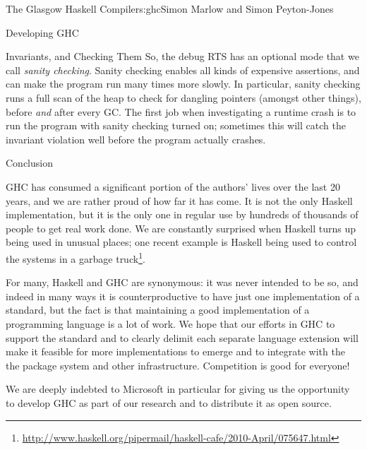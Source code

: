 \begin{aosachapter}{The Glasgow Haskell Compiler}{s:ghc}{Simon Marlow and Simon Peyton-Jones}
\begin{aosasect1}{Developing GHC}
\begin{aosasect2}{Invariants, and Checking Them}
So, the debug RTS has an optional mode that we call \emph{sanity
  checking}.  Sanity checking enables all kinds of expensive
assertions, and can make the program run many times more slowly.  In
particular, sanity checking runs a full scan of the heap to check for
dangling pointers (amongst other things), before \emph{and} after
every GC.  The first job when investigating a runtime crash is to run
the program with sanity checking turned on; sometimes this will catch
the invariant violation well before the program actually crashes.

\end{aosasect2}

\end{aosasect1}

\begin{aosasect1}{Conclusion}

GHC has consumed a significant portion of the authors' lives over the
last 20 years, and we are rather proud of how far it has come.  It is
not the only Haskell implementation, but it is the only one in regular
use by hundreds of thousands of people to get real work done.  We are
constantly surprised when Haskell turns up being used in unusual
places; one recent example is Haskell being used to control the
systems in a garbage
truck\footnote{\url{http://www.haskell.org/pipermail/haskell-cafe/2010-April/075647.html}}.

For many, Haskell and GHC are synonymous: it was never intended to be
so, and indeed in many ways it is counterproductive to have just one
implementation of a standard, but the fact is that maintaining a good
implementation of a programming language is a lot of work.  We hope
that our efforts in GHC to support the standard and to clearly delimit
each separate language extension will make it feasible for more
implementations to emerge and to integrate with the the package system
and other infrastructure.  Competition is good for everyone!

We are deeply indebted to Microsoft in particular for giving us the
opportunity to develop GHC as part of our research and to distribute
it as open source.

\end{aosasect1}

\end{aosachapter}
